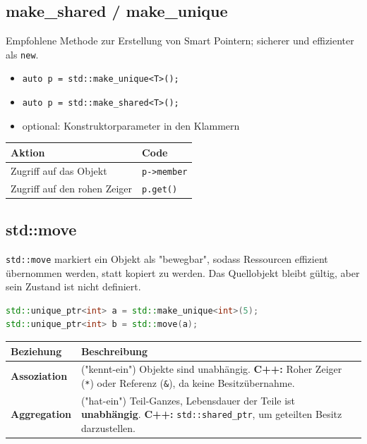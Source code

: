 \documentclass[8pt, landscape]{article}
\begin{document}
\begin{multicols*}{4}
\subsection*{make\_shared / make\_unique}

\begingroup\sloppy
Empfohlene Methode zur Erstellung von Smart Pointern; sicherer und effizienter als \lstinline|new|.
\begin{itemize}
    \item \lstinline|auto p = std::make_unique<T>();|
    \item \lstinline|auto p = std::make_shared<T>();| 
    \item optional: Konstruktorparameter in den Klammern
\end{itemize}

\noindent
\begin{tabularx}{\linewidth}{l l}
\toprule
\textbf{Aktion} & \textbf{Code} \\
\midrule
Zugriff auf das Objekt & \lstinline|p->member| \\
Zugriff auf den rohen Zeiger & \lstinline|p.get()| \\
\bottomrule
\end{tabularx}


\endgroup

\subsection*{std::move}
\lstinline|std::move| markiert ein Objekt als "bewegbar", sodass Ressourcen effizient übernommen werden, statt kopiert zu werden. Das Quellobjekt bleibt gültig, aber sein Zustand ist nicht definiert.
\begin{lstlisting}[language=C++]
std::unique_ptr<int> a = std::make_unique<int>(5);
std::unique_ptr<int> b = std::move(a); 
\end{lstlisting}

\noindent
\begin{tabularx}{\linewidth}{l >{\RaggedRight}X}
\toprule
\textbf{Beziehung} & \textbf{Beschreibung } \\
\midrule
\textbf{Assoziation} & ("kennt-ein") Objekte sind unabhängig. \newline
\textbf{C++:} Roher Zeiger (\texttt{*}) oder Referenz (\texttt{\&}), da keine Besitzübernahme. \\

\textbf{Aggregation} & ("hat-ein") Teil-Ganzes, Lebensdauer der Teile ist \textbf{unabhängig}. \newline
\textbf{C++:} \texttt{std::shared\_ptr}, um geteilten Besitz darzustellen. \\



\end{tabularx}
\end{multicols*}
\end{document}
